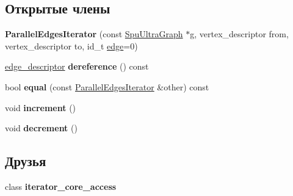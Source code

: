 \subsection*{Открытые члены}
\begin{DoxyCompactItemize}
\item 
\mbox{\label{class_s_p_u___g_r_a_p_h_1_1_spu_ultra_graph_1_1_parallel_edges_iterator_a6cf06355aadbb64e98d33a0ebfa25209}} 
{\bfseries Parallel\+Edges\+Iterator} (const \hyperlink{class_s_p_u___g_r_a_p_h_1_1_spu_ultra_graph}{Spu\+Ultra\+Graph} $\ast$g, vertex\+\_\+descriptor from, vertex\+\_\+descriptor to, id\+\_\+t \hyperlink{class_s_p_u___g_r_a_p_h_1_1_spu_ultra_graph_a51468aa2278d3abb0c338ffbeac7747a}{edge}=0)
\item 
\mbox{\label{class_s_p_u___g_r_a_p_h_1_1_spu_ultra_graph_1_1_parallel_edges_iterator_af9b4496f37517a45883e5e21d2d31d44}} 
\hyperlink{class_s_p_u___g_r_a_p_h_1_1_spu_ultra_graph_a5f3776e003ef0a1648f1d9f84289810b}{edge\+\_\+descriptor} {\bfseries dereference} () const
\item 
\mbox{\label{class_s_p_u___g_r_a_p_h_1_1_spu_ultra_graph_1_1_parallel_edges_iterator_a8e1eb41f9082eb0140415ca3b4995d2e}} 
bool {\bfseries equal} (const \hyperlink{class_s_p_u___g_r_a_p_h_1_1_spu_ultra_graph_1_1_parallel_edges_iterator}{Parallel\+Edges\+Iterator} \&other) const
\item 
\mbox{\label{class_s_p_u___g_r_a_p_h_1_1_spu_ultra_graph_1_1_parallel_edges_iterator_a68f2818f6ea4a48761ba8f6fcbb3ee83}} 
void {\bfseries increment} ()
\item 
\mbox{\label{class_s_p_u___g_r_a_p_h_1_1_spu_ultra_graph_1_1_parallel_edges_iterator_a523f5ff4e4c5b3610bb81f8f8edfc6bd}} 
void {\bfseries decrement} ()
\end{DoxyCompactItemize}
\subsection*{Друзья}
\begin{DoxyCompactItemize}
\item 
\mbox{\label{class_s_p_u___g_r_a_p_h_1_1_spu_ultra_graph_1_1_parallel_edges_iterator_a0975271623c74c5b89bdf8d7fbce69c4}} 
class {\bfseries iterator\+\_\+core\+\_\+access}
\end{DoxyCompactItemize}


